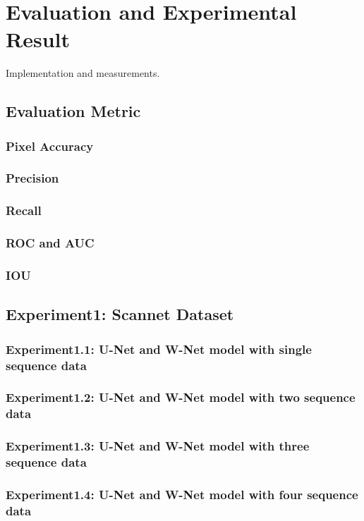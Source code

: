 

    \chapter{Evaluation and Experimental Result}

    Implementation and measurements.
    
    \section{Evaluation Metric}
    \subsection{Pixel Accuracy}
    \subsection{Precision}
    \subsection{Recall}
    \subsection{ROC and AUC}
    \subsection{IOU}
    \section{Experiment1: Scannet Dataset}
    \subsection{Experiment1.1: U-Net and W-Net model with single sequence data}
    \subsection{Experiment1.2: U-Net and W-Net model with two sequence data}
    \subsection{Experiment1.3: U-Net and W-Net model with three sequence data}
    \subsection{Experiment1.4: U-Net and W-Net model with four sequence data}
